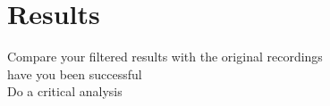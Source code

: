 \documentclass{article}
\begin{document}
\section{Results}
Compare your filtered results with the original recordings\\
have you been successful\\
Do a critical analysis



\end{document}
